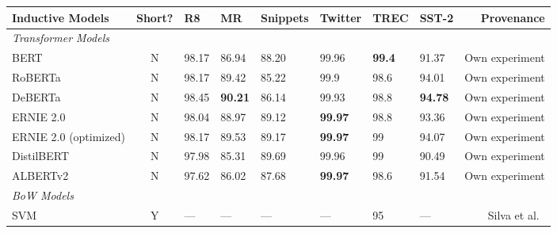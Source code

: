 \documentclass[runningheads]{llncs}
\begin{document}
\begin{table*}[!ht]
\begin{threeparttable}
{\begin{tabular}{lcllllllr}
            \toprule
            \textbf{Inductive Models}               & \textbf{Short?} & \textbf{R8}      & \textbf{MR}    & \textbf{Snippets}           & \textbf{Twitter} & \textbf{TREC} & \textbf{SST-2} & \textbf{Provenance}\\
            \midrule
            \emph{Transformer Models} \\
            BERT                                    & N                   & 98.17\tnote{} & 86.94          & 88.20                             & 99.96            & \textbf{99.4} & 91.37          & Own experiment                  \\
            RoBERTa                                 & N                   & 98.17\tnote{} & 89.42          & 85.22                             & 99.9             & 98.6          & 94.01          & Own experiment                  \\
            DeBERTa                                 & N                   & 98.45\tnote{} & \textbf{90.21} & 86.14                             & 99.93            & 98.8          & \textbf{94.78} & Own experiment                  \\
            ERNIE 2.0                               & N                   & 98.04\tnote{} & 88.97          & 89.12                             & \textbf{99.97}   & 98.8          & 93.36          & Own experiment                  \\
            ERNIE 2.0 (optimized)                   & N                   & 98.17\tnote{} & 89.53          & 89.17                             & \textbf{99.97}   & 99            & 94.07          & Own experiment                  \\
            DistilBERT                              & N                   & 97.98\tnote{} & 85.31          & 89.69                             & 99.96            & 99            & 90.49          & Own experiment                  \\
            ALBERTv2                                & N                   & 97.62            & 86.02          & 87.68                             & \textbf{99.97}   & 98.6          & 91.54          & Own experiment                  \\
            \midrule
            \emph{BoW Models} \\
            SVM     & Y & --- & --- & --- & --- & 95\tnote{} & --- & Silva et al.~\cite{DBLP:journals/air/SilvaCMW11} \\


\end{tabular}}
\end{threeparttable}
\end{table*}
\end{document}
